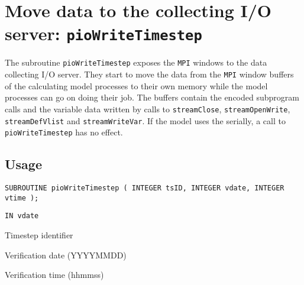 \section{Move data to the collecting I/O server: {\tt pioWriteTimestep}}
The subroutine {\tt pioWriteTimestep} exposes the {\tt MPI} windows to the 
data collecting I/O server. They start to move the data from the {\tt MPI} 
window buffers of the calculating model processes to their own memory while 
the model processes can go on doing their job. The buffers contain the encoded 
subprogram calls and the variable data written by calls to {\tt streamClose}, 
{\tt streamOpenWrite}, {\tt streamDefVlist} and {\tt streamWriteVar}. If the 
model uses the {\CDI} serially, a call to\\
 {\tt pioWriteTimestep} has no effect. 

\subsection*{Usage}
\begin{verbatim}
SUBROUTINE pioWriteTimestep ( INTEGER tsID, INTEGER vdate, INTEGER vtime );
\end{verbatim}

\hspace*{4mm}\begin{minipage}[]{15cm}
\begin{deflist}{\tt IN  vdate\ } 
\item[{\tt IN  tsID}]
Timestep identifier
\item[{\tt IN  vdate}]    
Verification date (YYYYMMDD)
\item[{\tt IN  vtime}]
Verification time (hhmmss)
\end{deflist}
\end{minipage}


